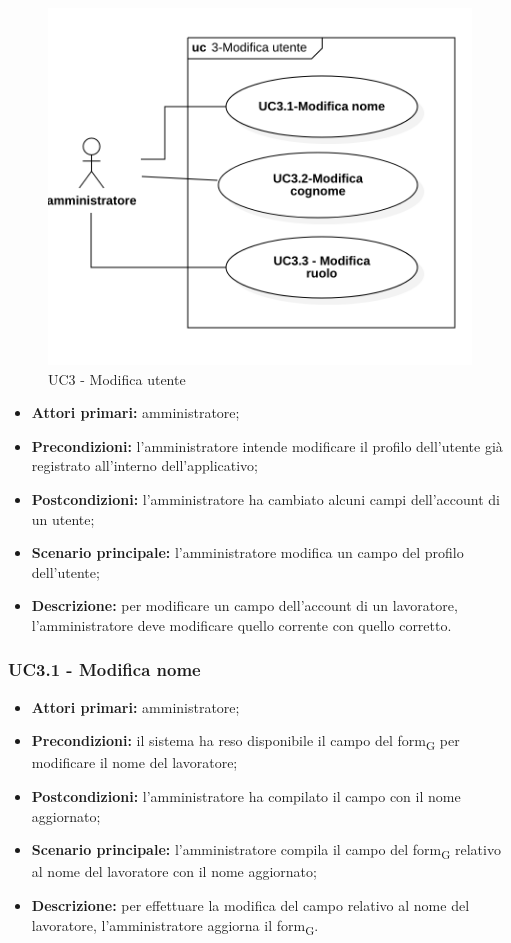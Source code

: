 \begin{figure}[H]
	\centering
	\includegraphics[scale=0.52]{res/images/uc3.png}
	\caption{UC3 - Modifica utente}
\end{figure}
\begin{itemize}
	\item 	\textbf{Attori primari:} amministratore;
	\item 	\textbf{Precondizioni:} l'amministratore intende modificare il profilo dell'utente già registrato all'interno dell'applicativo;
	\item 	\textbf{Postcondizioni:} l'amministratore ha cambiato alcuni campi dell'account di un utente;
	\item 	\textbf{Scenario principale:} l'amministratore modifica un campo del profilo dell'utente;
	\item 	\textbf{Descrizione:} per modificare un campo dell'account di un lavoratore, l'amministratore deve modificare quello corrente con quello corretto.

\end{itemize}

\subsubsection{UC3.1 - Modifica nome}

\begin{itemize}
	\item 	\textbf{Attori primari:} amministratore;
	\item 	\textbf{Precondizioni:} il sistema ha reso disponibile il campo del \gls{form}\textsubscript{G} per modificare il nome del lavoratore;
	\item 	\textbf{Postcondizioni:}  l'amministratore ha compilato il campo con il nome aggiornato;
	\item 	\textbf{Scenario principale:} l'amministratore compila il campo del \gls{form}\textsubscript{G} relativo al nome del lavoratore con il nome aggiornato;
	\item 	\textbf{Descrizione:} per effettuare la modifica del campo relativo al nome del lavoratore, l'amministratore aggiorna il \gls{form}\textsubscript{G}.
\end{itemize}

